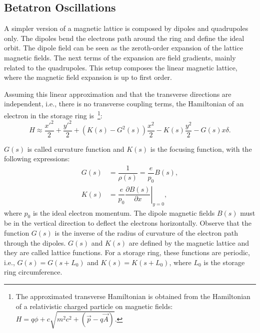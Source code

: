 \subsection{Betatron Oscillations}
A simpler version of a magnetic lattice is composed by dipoles and quadrupoles only. The dipoles bend the electrons path around the ring and define the ideal orbit. The dipole field can be seen as the zeroth-order expansion of the lattice magnetic fields. The next terms of the expansion are field gradients, mainly related to the quadrupoles. This setup composes the linear magnetic lattice, where the magnetic field expansion is up to first order.

Assuming this linear approximation and that the transverse directions are independent, i.e., there is no transverse coupling terms, the Hamiltonian of an electron in the storage ring is~\footnote{The approximated transverse Hamiltonian is obtained from the Hamiltonian of a relativistic charged particle on magnetic fields: $H = q\phi + c\sqrt{m^2c^2 + \left(\vec{p} - q\vec{A}\right) }$.}:
\begin{equation}
    H \approx \dfrac{{x'}^2}{2} + \dfrac{{y'}^2}{2} + \left(K(s)- G^{2}(s)\right)\dfrac{{x}^2}{2} - K(s) \frac{y^2}{2} - G(s) x \delta.
    \label{transv_hamilton}
\end{equation}

$G(s)$ is called curvature function and $K(s)$ is the focusing function, with the following expressions:
\begin{align}
    G(s) &= \dfrac{1}{\rho(s)} = \dfrac{e}{p_0}B(s), \\
    K(s) &= \dfrac{e}{p_0}\left.\dfrac{\partial B(s)}{\partial x}\right|_{y=0},
\end{align}
where $p_0$ is the ideal electron momentum. The dipole magnetic fields $B(s)$ must be in the vertical direction to deflect the electrons horizontally. Observe that the function $G(s)$ is the inverse of the radius of curvature of the electron path through the dipoles. $G(s)$ and $K(s)$ are defined by the magnetic lattice and they are called lattice functions. For a storage ring, these functions are periodic, i.e., $G(s) = G(s+L_0)$ and $K(s) = K(s+L_0)$, where $L_0$ is the storage ring circumference.



